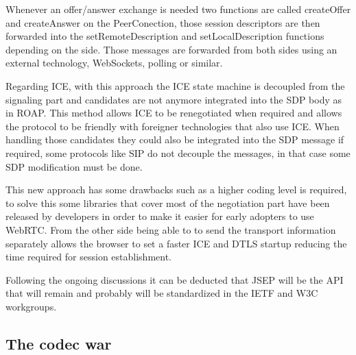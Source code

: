 Whenever an offer/answer exchange is needed two functions are called createOffer and createAnswer on the PeerConection, those session descriptors are then forwarded into the setRemoteDescription and setLocalDescription functions depending on the side. Those messages are forwarded from both sides using an external technology, WebSockets, polling or similar. 

Regarding ICE, with this approach the ICE state machine is decoupled from the signaling part and candidates are not anymore integrated into the SDP body as in ROAP. This method allows ICE to be renegotiated when required and allows the protocol to be friendly with foreigner technologies that also use ICE. When handling those candidates they could also be integrated into the SDP message if required, some protocols like SIP do not decouple the messages, in that case some SDP modification must be done. 

This new approach has some drawbacks such as a higher coding level is required, to solve this some libraries that cover most of the negotiation part have been released by developers in order to make it easier for early adopters to use WebRTC. From the other side being able to to send the transport information separately allows the browser to set a faster ICE and DTLS startup reducing the time required for session establishment. 

Following the ongoing discussions it can be deducted that JSEP will be the API that will remain and probably will be standardized in the IETF and W3C workgroups.

\subsection{The codec war}

